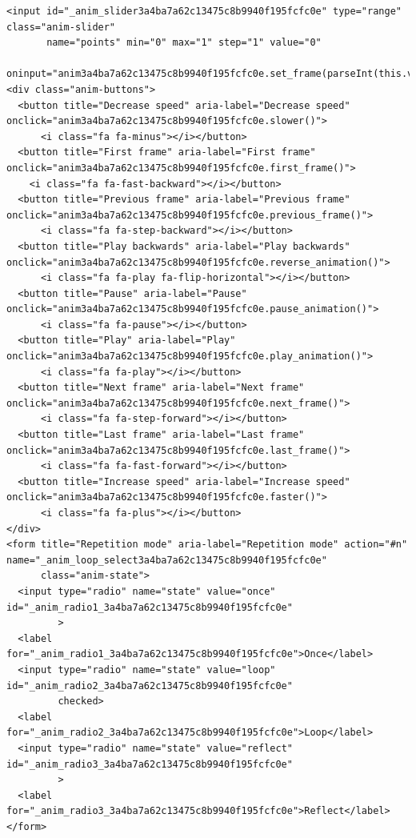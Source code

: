 \begin{verbatim}
<input id="_anim_slider3a4ba7a62c13475c8b9940f195fcfc0e" type="range" class="anim-slider"
       name="points" min="0" max="1" step="1" value="0"
       oninput="anim3a4ba7a62c13475c8b9940f195fcfc0e.set_frame(parseInt(this.value));">
<div class="anim-buttons">
  <button title="Decrease speed" aria-label="Decrease speed" onclick="anim3a4ba7a62c13475c8b9940f195fcfc0e.slower()">
      <i class="fa fa-minus"></i></button>
  <button title="First frame" aria-label="First frame" onclick="anim3a4ba7a62c13475c8b9940f195fcfc0e.first_frame()">
    <i class="fa fa-fast-backward"></i></button>
  <button title="Previous frame" aria-label="Previous frame" onclick="anim3a4ba7a62c13475c8b9940f195fcfc0e.previous_frame()">
      <i class="fa fa-step-backward"></i></button>
  <button title="Play backwards" aria-label="Play backwards" onclick="anim3a4ba7a62c13475c8b9940f195fcfc0e.reverse_animation()">
      <i class="fa fa-play fa-flip-horizontal"></i></button>
  <button title="Pause" aria-label="Pause" onclick="anim3a4ba7a62c13475c8b9940f195fcfc0e.pause_animation()">
      <i class="fa fa-pause"></i></button>
  <button title="Play" aria-label="Play" onclick="anim3a4ba7a62c13475c8b9940f195fcfc0e.play_animation()">
      <i class="fa fa-play"></i></button>
  <button title="Next frame" aria-label="Next frame" onclick="anim3a4ba7a62c13475c8b9940f195fcfc0e.next_frame()">
      <i class="fa fa-step-forward"></i></button>
  <button title="Last frame" aria-label="Last frame" onclick="anim3a4ba7a62c13475c8b9940f195fcfc0e.last_frame()">
      <i class="fa fa-fast-forward"></i></button>
  <button title="Increase speed" aria-label="Increase speed" onclick="anim3a4ba7a62c13475c8b9940f195fcfc0e.faster()">
      <i class="fa fa-plus"></i></button>
</div>
<form title="Repetition mode" aria-label="Repetition mode" action="#n" name="_anim_loop_select3a4ba7a62c13475c8b9940f195fcfc0e"
      class="anim-state">
  <input type="radio" name="state" value="once" id="_anim_radio1_3a4ba7a62c13475c8b9940f195fcfc0e"
         >
  <label for="_anim_radio1_3a4ba7a62c13475c8b9940f195fcfc0e">Once</label>
  <input type="radio" name="state" value="loop" id="_anim_radio2_3a4ba7a62c13475c8b9940f195fcfc0e"
         checked>
  <label for="_anim_radio2_3a4ba7a62c13475c8b9940f195fcfc0e">Loop</label>
  <input type="radio" name="state" value="reflect" id="_anim_radio3_3a4ba7a62c13475c8b9940f195fcfc0e"
         >
  <label for="_anim_radio3_3a4ba7a62c13475c8b9940f195fcfc0e">Reflect</label>
</form>
\end{verbatim}

